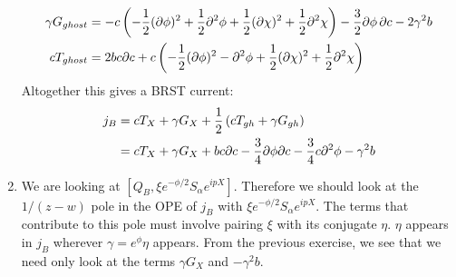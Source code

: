 \documentclass[11pt, class=article, crop=false]{standalone}
\begin{document}
\begin{enumerate}
\[\begin{aligned}
		\gamma G_{ghost} &= -c \left(-\frac12 (\partial \phi)^2 + \frac12 \partial^2 \phi + \frac12 (\partial\chi)^2 + \frac12 \partial^2 \chi\right) - \frac32 \partial \phi\, \partial c - 2 \gamma^2 b\\
		c T_{ghost} &= 2 b c \partial c + c \left(-\frac12 (\partial \phi)^2 - \partial^2 \phi + \frac12 (\partial\chi)^2 + \frac12 \partial^2 \chi \right)
	\end{aligned}
	\]
	Altogether this gives a BRST current:
	\[
	\begin{aligned}
		j_B &= c T_X + \gamma G_X +  \frac12 \left(c T_{gh} + \gamma G_{gh} \right)\\
		&=  c T_X + \gamma G_X + b c \partial c - \frac34 \partial \phi \partial c - \frac34 c \partial^2 \phi - \gamma^2 b
	\end{aligned}
	\]
	\item We are looking at $[Q_B, \xi e^{-\phi/2} S_\alpha e^{i p X}]$. Therefore we should look at the $1/(z-w)$ pole in the OPE of $j_B$ with $\xi e^{-\phi/2} S_\alpha e^{i p X}$. The terms that contribute to this pole must involve pairing $\xi$ with its conjugate $\eta$. $\eta$ appears in $j_B$ wherever $\gamma = e^{\phi} \eta$ appears. From the previous exercise, we see that we need only look at the terms $\gamma G_X$ and $-\gamma^2 b$.
	

\end{enumerate}
\end{document}
